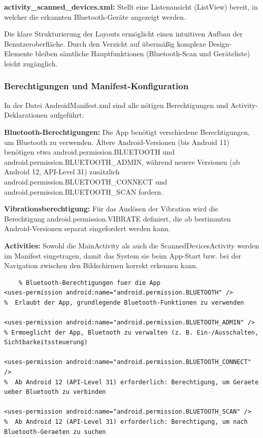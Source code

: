 \documentclass[a4paper, 12pt]{article} %
\begin{document}
\begin{spacing}{1.8}
\textbf{activity\_scanned\_devices.xml\cite{lukiano12_lkw_assist}:} Stellt eine Listenansicht (ListView) bereit, in welcher die erkannten Bluetooth-Geräte angezeigt werden.

Die klare Strukturierung der Layouts ermöglicht einen intuitiven Aufbau der Benutzeroberfläche. Durch den Verzicht auf übermäßig 
komplexe Design-Elemente bleiben sämtliche Hauptfunktionen (Bluetooth-Scan und Geräteliste) leicht zugänglich.

\subsubsection{Berechtigungen und Manifest-Konfiguration}
In der Datei AndroidManifest.xml sind alle nötigen Berechtigungen und Activity-Deklarationen aufgeführt:

\textbf{Bluetooth-Berechtigungen\cite{lukiano12_lkw_assist}:} Die App benötigt verschiedene Berechtigungen, um Bluetooth zu verwenden. Ältere Android-Versionen (bis Android 11) benötigen etwa
 android.permission.BLUETOOTH und android.permission.BLUETOOTH\_ADMIN, während neuere Versionen (ab Android 12, API-Level 31)
  zusätzlich android.permission.BLUETOOTH\_CONNECT und android.permission.BLUETOOTH\_SCAN fordern.

\textbf{Vibrationsberechtigung\cite{lukiano12_lkw_assist}:} Für das Auslösen der Vibration wird die Berechtigung android.permission.VIBRATE definiert, die ab bestimmten Android-Versionen separat eingefordert werden kann.

\textbf{Activities\cite{lukiano12_lkw_assist}:} Sowohl die MainActivity als auch die ScannedDevicesActivity werden 
im Manifest eingetragen, damit das System sie beim App-Start bzw. bei der Navigation zwischen den Bildschirmen korrekt erkennen kann.

\begin{lstlisting}
    % Bluetooth-Berechtigungen fuer die App
<uses-permission android:name="android.permission.BLUETOOTH" />
%  Erlaubt der App, grundlegende Bluetooth-Funktionen zu verwenden 

<uses-permission android:name="android.permission.BLUETOOTH_ADMIN" />
% Ermoeglicht der App, Bluetooth zu verwalten (z. B. Ein-/Ausschalten, Sichtbarkeitssteuerung) 

<uses-permission android:name="android.permission.BLUETOOTH_CONNECT" />
%  Ab Android 12 (API-Level 31) erforderlich: Berechtigung, um Geraete ueber Bluetooth zu verbinden 

<uses-permission android:name="android.permission.BLUETOOTH_SCAN" />
%  Ab Android 12 (API-Level 31) erforderlich: Berechtigung, um nach Bluetooth-Geraeten zu suchen 


\end{lstlisting}
\end{spacing}
\end{document}
